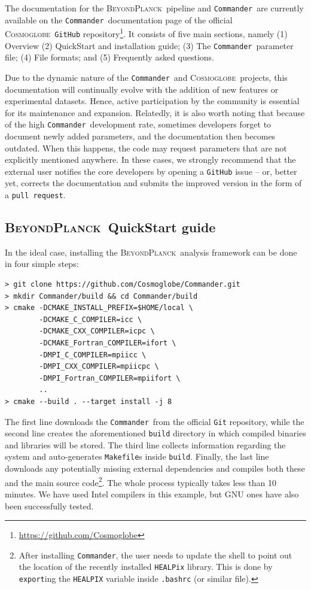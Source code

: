 \documentclass[twocolumn]{aa}
\def\commander{\texttt{Commander}}
\newcommand{\BP}{\textsc{BeyondPlanck}}
\newcommand{\cosmoglobe}{\textsc{Cosmoglobe}}
\begin{document}
The documentation for the \BP\ pipeline and \commander\ are currently available on the \commander\ documentation page of the official \cosmoglobe\ \texttt{GitHub} repository\footnote{\url{https://github.com/Cosmoglobe}}. It consists of five main sections, namely (1) Overview (2) QuickStart and installation guide; (3) The \commander\ parameter file; (4) File formats; and (5) Frequently asked questions.

Due to the dynamic nature of the \commander\ and \cosmoglobe\ projects, this documentation will continually evolve with the addition of new features or experimental datasets. Hence, active participation by the community is essential for its maintenance and expansion. Relatedly, it is also worth noting that because of the high \commander\ development rate, sometimes developers forget to document newly added parameters, and the documentation then becomes outdated. When this happens, the code may request parameters that are not explicitly mentioned anywhere. In these cases, we strongly recommend that the external user notifies the core developers by opening a \texttt{GitHub} issue -- or, better yet, corrects the documentation and submits the improved version in the form of a \texttt{pull request}.

\subsection{\BP\ QuickStart guide}
\label{sec:quickstart}

In the ideal case, installing the \BP\ analysis framework can be done
in four simple steps:
{\small
\begin{verbatim}
> git clone https://github.com/Cosmoglobe/Commander.git 
> mkdir Commander/build && cd Commander/build
> cmake -DCMAKE_INSTALL_PREFIX=$HOME/local \
        -DCMAKE_C_COMPILER=icc \
        -DCMAKE_CXX_COMPILER=icpc \
        -DCMAKE_Fortran_COMPILER=ifort \
        -DMPI_C_COMPILER=mpiicc \
        -DMPI_CXX_COMPILER=mpiicpc \
        -DMPI_Fortran_COMPILER=mpiifort \
        ..
> cmake --build . --target install -j 8
\end{verbatim}}
\noindent The first line downloads the \commander\ from the official \texttt{Git} repository, while the second line creates the aforementioned \texttt{build} directory in which compiled binaries and libraries will be stored. The third line collects information regarding the system and auto-generates \texttt{Makefile}s inside \texttt{build}. Finally, the last line downloads any potentially missing external dependencies and compiles both these and the main source code\footnote{After installing \commander, the user needs to update the shell to point out the location of the recently installed \texttt{HEALPix} library. This is done by \texttt{export}ing the \texttt{HEALPIX} variable inside \texttt{.bashrc} (or similar file).}. The whole process typically takes less than 10 minutes. We have used Intel compilers in this example, but GNU ones have also been successfully tested.
\end{document}
